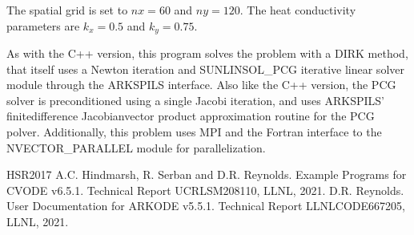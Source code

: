 \documentclass[letterpaper,10pt,english]{sphinxmanual}
\begin{document}
\sphinxAtStartPar
The spatial grid is set to \(nx=60\) and \(ny=120\).  The heat
conductivity parameters are \(k_x=0.5\) and \(k_y=0.75\).

\sphinxAtStartPar
As with the C++ version, this program solves the problem with a DIRK
method, that itself uses a Newton iteration and SUNLINSOL\_PCG
iterative linear solver module through the ARKSPILS interface.  Also
like the C++ version, the PCG solver is preconditioned using a single
Jacobi iteration, and uses ARKSPILS’ finite\sphinxhyphen{}difference Jacobian\sphinxhyphen{}vector
product approximation routine for the PCG polver.  Additionally, this
problem uses MPI and the Fortran interface to the NVECTOR\_PARALLEL
module for parallelization.

\sphinxstepscope
{}\label{\detokenize{References:references}}
\begin{sphinxthebibliography}{HSR2017}
\sphinxAtStartPar
A.C. Hindmarsh, R. Serban and D.R. Reynolds. Example
Programs for CVODE v6.5.1. Technical Report
UCRL\sphinxhyphen{}SM\sphinxhyphen{}208110, LLNL, 2021.
\sphinxAtStartPar
D.R. Reynolds. User Documentation for ARKODE
v5.5.1. Technical Report LLNL\sphinxhyphen{}CODE\sphinxhyphen{}667205, LLNL, 2021.
\end{sphinxthebibliography}



\renewcommand{\indexname}{Index}
\printindex
\end{document}
